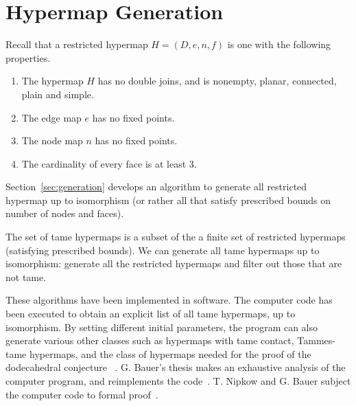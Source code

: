 \section{Hypermap Generation}\label{sec:hyper-gener}

Recall that a restricted hypermap  $H = (D,e,n,f)$ is one with the following
properties.
\begin{enumerate}
\item The hypermap $H$ has no double joins, and is nonempty, planar,
  connected, plain and simple.
\item The edge map $e$ has no fixed points.  %
\item The node map $n$ has no fixed points.
\item The cardinality of every face is at least $3$.
\end{enumerate}

Section~\ref{sec:generation} develops an algorithm to generate all
restricted hypermap up to isomorphism (or rather all that satisfy
prescribed bounds on number of nodes and faces).

The set of tame hypermaps is a subset of the a finite set of
restricted hypermaps (satisfying prescribed bounds).  We can generate
all tame hypermaps up to isomorphism: generate all the restricted
hypermaps and filter out those that are not tame.

These algorithms have been implemented in software.  The computer code
has been executed to obtain an explicit list of all tame hypermaps, up
to isomorphism.  By setting different initial parameters, the program
can also generate various other classes such as hypermaps with tame
contact, Tammes-tame hypermaps, and the class of hypermaps needed for
the proof of the dodecahedral conjecture
~\cite{Hales:2010:Dodec}. %
G. Bauer's thesis makes an exhaustive analysis of the computer
program, and reimplements the code~\cite{Bauer:2006:Thesis}.  T. Nipkow and G.
Bauer subject the computer code to formal proof~\cite{Nipkow:2005:Tame}.



